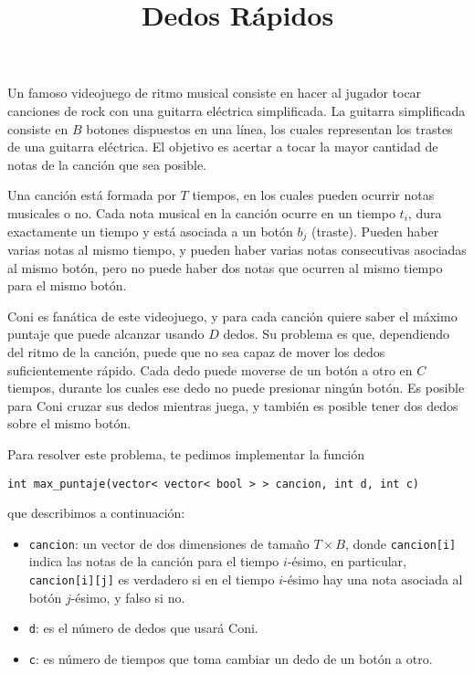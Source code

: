 \documentclass{oci}
\title{Dedos Rápidos}
\begin{document}
\begin{problemDescription}
Un famoso videojuego de ritmo musical consiste en hacer al jugador tocar
canciones de rock con una guitarra eléctrica simplificada.
La guitarra simplificada consiste en $B$ botones dispuestos en una línea, los
cuales representan los trastes de una guitarra eléctrica.
El objetivo es acertar a tocar la mayor cantidad de notas de la canción que
sea posible.

Una canción está formada por $T$ tiempos, en los cuales pueden ocurrir notas
musicales o no.
Cada nota musical en la canción ocurre en un tiempo $t_i$, dura exactamente
un tiempo y está asociada a un botón $b_j$ (traste).
Pueden haber varias notas al mismo tiempo, y pueden haber varias notas
consecutivas asociadas al mismo botón, pero no puede haber dos notas que
ocurren al mismo tiempo para el mismo botón.

Coni es fanática de este videojuego, y para cada canción quiere saber el máximo
puntaje que puede alcanzar usando $D$ dedos.
Su problema es que, dependiendo del ritmo de la canción, puede que no sea
capaz de mover los dedos suficientemente rápido.
Cada dedo puede moverse de un botón a otro en $C$ tiempos, durante los cuales
ese dedo no puede presionar ningún botón.
Es posible para Coni cruzar sus dedos mientras juega, y también es posible
tener dos dedos sobre el mismo botón.

\end{problemDescription}

Para resolver este problema, te pedimos implementar la función
\begin{verbatim}
int max_puntaje(vector< vector< bool > > cancion, int d, int c)
\end{verbatim}
que describimos a continuación:

\begin{inputDescription}
\begin{itemize}
 \item \verb#cancion#: un vector de dos dimensiones de tamaño $T \times B$,
 donde \verb#cancion[i]# indica las notas de la canción para el tiempo
 $i$-ésimo, en particular, \verb#cancion[i][j]# es verdadero si en el tiempo
 $i$-ésimo hay una nota asociada al botón $j$-ésimo, y falso si no.
 \item \verb#d#: es el número de dedos que usará Coni.
 \item \verb#c#: es número de tiempos que toma cambiar un dedo de un botón
 a otro.
\end{itemize}
\end{inputDescription}
\end{document}
